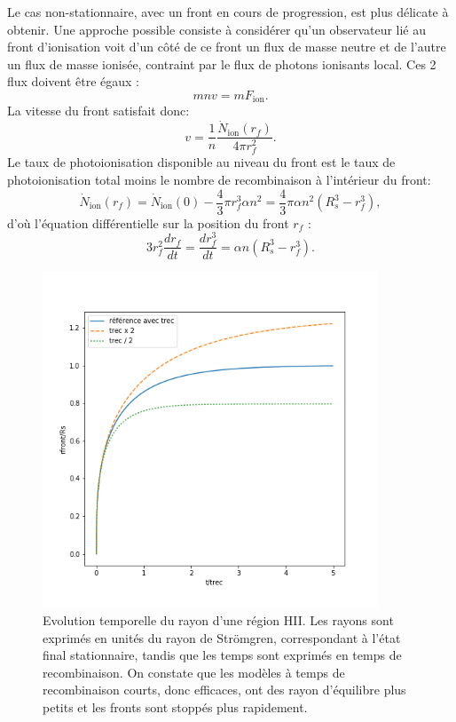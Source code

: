 Le cas non-stationnaire, avec un front en cours de progression, est plus délicate à obtenir. Une approche possible consiste à considérer qu'un observateur lié au front d'ionisation voit d'un côté de ce front un flux de masse neutre et de l'autre un flux de masse ionisée, contraint par le flux de photons ionisants local. Ces 2 flux doivent être égaux :
\begin{equation}
m n v = m F_\mathrm{ion}.
\end{equation}
La vitesse du front satisfait donc:
\begin{equation}
v=\frac{1}{n}\frac{\dot N_\mathrm{ion}(r_f)}{4\pi r_f^2}.
\end{equation}
Le taux de photoionisation disponible au niveau du front est le taux de photoionisation total moins le nombre de recombinaison à l'intérieur du front:
\begin{equation}
\dot N_\mathrm{ion}(r_f)=\dot N_\mathrm{ion}(0)-\frac{4}{3}\pi r_f^3\alpha n^2=\frac{4}{3}\pi \alpha n^2 (R_s^3-r_f^3),
\end{equation}
d'où l'équation différentielle sur la position du front $r_f$ :
\begin{equation}
3r_f^2\frac{d r_f}{dt}=\frac{dr_f^3}{dt}=\alpha n  (R_s^3-r_f^3).
\end{equation}

\begin{figure}[htbp]
	\centering
		\includegraphics[height=10cm]{figs/strom.png}
		\caption[Evolution temporelle de la position d'un front ionisant]{Evolution temporelle du rayon d'une région HII. Les rayons sont exprimés en unités du rayon de Strömgren, correspondant à l'état final stationnaire, tandis que les temps sont exprimés en temps de recombinaison. On constate que les modèles à temps de recombinaison courts, donc efficaces, ont des rayon d'équilibre plus petits et les fronts sont stoppés plus rapidement.}
	\label{f:strom}
\end{figure}

